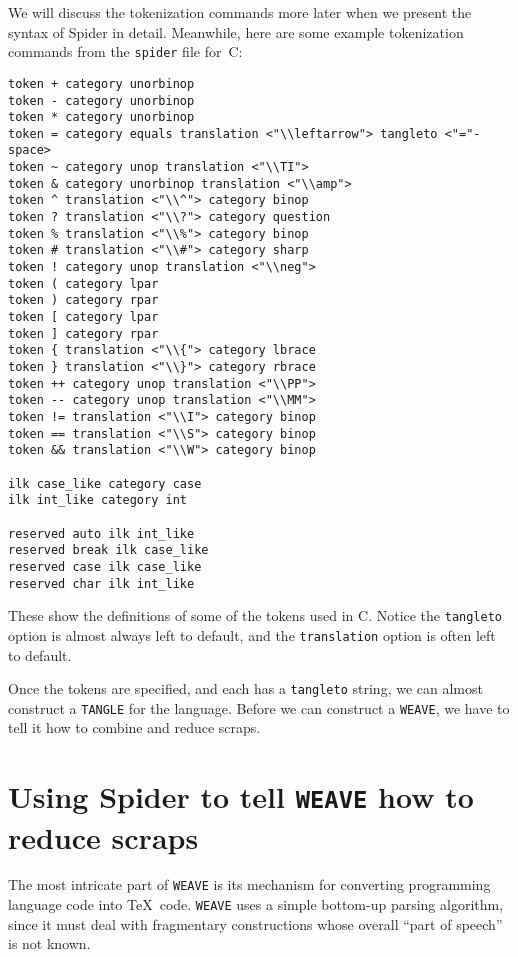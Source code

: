 We will discuss the tokenization commands more later when we present
the syntax of {Spider} in detail.
Meanwhile, 
here are some example tokenization commands from the {\tt spider} file
for~C:
\begin{verbatim}
token + category unorbinop
token - category unorbinop
token * category unorbinop
token = category equals translation <"\\leftarrow"> tangleto <"="-space>
token ~ category unop translation <"\\TI">
token & category unorbinop translation <"\\amp">
token ^ translation <"\\^"> category binop
token ? translation <"\\?"> category question
token % translation <"\\%"> category binop
token # translation <"\\#"> category sharp
token ! category unop translation <"\\neg">
token ( category lpar
token ) category rpar
token [ category lpar
token ] category rpar
token { translation <"\\{"> category lbrace
token } translation <"\\}"> category rbrace
token ++ category unop translation <"\\PP">
token -- category unop translation <"\\MM">
token != translation <"\\I"> category binop
token == translation <"\\S"> category binop
token && translation <"\\W"> category binop

ilk case_like category case
ilk int_like category int

reserved auto ilk int_like
reserved break ilk case_like
reserved case ilk case_like
reserved char ilk int_like
\end{verbatim}
These show the definitions of some of the tokens used in C.
Notice the {\tt tangleto} option is almost always left to default, and
the {\tt translation} option is often left to default.

Once the tokens are specified, and each has a {\tt tangleto} string,
we can almost construct a {\tt TANGLE} for the language. 
 Before we can construct a {\tt WEAVE}, we have to tell it how to
combine and reduce scraps.

\section{Using {Spider} to tell {\tt WEAVE} how to reduce scraps}
The most intricate part of {\tt WEAVE} is its mechanism for converting
programming language code into \TeX\ code.
{\tt WEAVE} uses a simple bottom-up parsing algorithm, since it
 must deal with fragmentary
constructions whose overall ``part of speech'' is not known.

